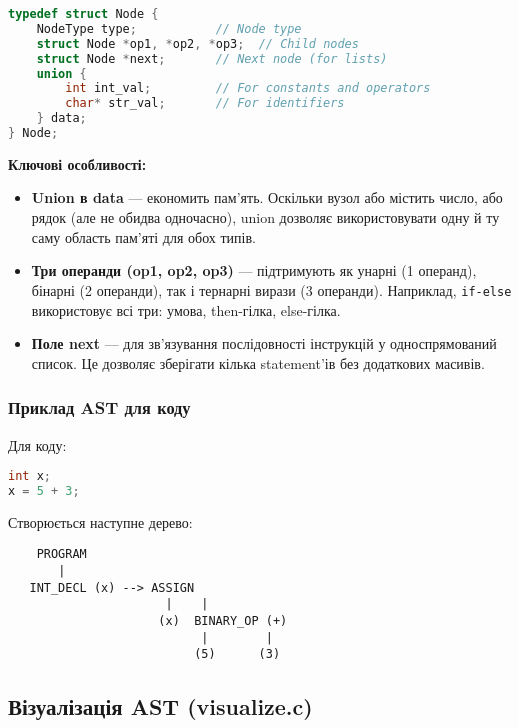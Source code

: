\documentclass[12pt,a4paper]{article}
\begin{document}
\begin{lstlisting}[language=C]
typedef struct Node {
    NodeType type;           // Node type
    struct Node *op1, *op2, *op3;  // Child nodes
    struct Node *next;       // Next node (for lists)
    union {
        int int_val;         // For constants and operators
        char* str_val;       // For identifiers
    } data;
} Node;
\end{lstlisting}

\textbf{Ключові особливості:}

\begin{itemize}
    \item \textbf{Union в data} --- економить пам'ять. Оскільки вузол або містить число, або рядок (але не обидва одночасно), union дозволяє використовувати одну й ту саму область пам'яті для обох типів.
    
    \item \textbf{Три операнди (op1, op2, op3)} --- підтримують як унарні (1 операнд), бінарні (2 операнди), так і тернарні вирази (3 операнди). Наприклад, \texttt{if-else} використовує всі три: умова, then-гілка, else-гілка.
    
    \item \textbf{Поле next} --- для зв'язування послідовності інструкцій у односпрямований список. Це дозволяє зберігати кілька statement'ів без додаткових масивів.
\end{itemize}

\subsubsection{Приклад AST для коду}

Для коду:
\begin{lstlisting}[language=C]
int x;
x = 5 + 3;
\end{lstlisting}

Створюється наступне дерево:

\begin{verbatim}
    PROGRAM
       |
   INT_DECL (x) --> ASSIGN
                      |    |
                     (x)  BINARY_OP (+)
                           |        |
                          (5)      (3)
\end{verbatim}

\subsection{Візуалізація AST (visualize.c)}
\end{document}
